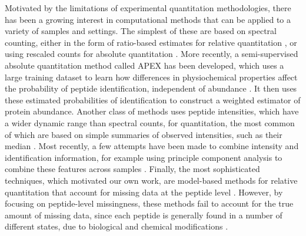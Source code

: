 Motivated by the limitations of experimental quantitation methodologies, there has been a growing interest in computational methods that can be applied to a variety of samples and settings.
The simplest of these are based on spectral counting, either in the form of ratio-based estimates for relative quantitation \citep{Liu:2004hv}, or using rescaled counts for absolute quantitation \citep{Ishihama:2005ir}.
More recently, a semi-supervised absolute quantitation method called APEX has been developed, which uses a large training dataset to learn how differences in physiochemical properties affect the probability of peptide identification, independent of abundance \citep{Lu:2006p10143}.
It then uses these estimated probabilities of identification to construct a weighted estimator of protein abundance.
%
Another class of methods uses peptide intensities, which have a wider dynamic range than spectral counts, for quantitation, the most common of which are based on simple summaries of observed intensities, such as their median \citep{deGodoy:2008jk, Silva:2005cn}.
Most recently, a few attempts have been made to combine intensity and identification information, for example using principle component analysis to combine these features across samples \citep[e.g.,][]{Dicker:2010ea}.
Finally, the most sophisticated techniques, which motivated our own work, are model-based methods for relative quantitation that account for missing data at the peptide level \citep{Karpievitch:2009wb,Luo:2009ff}.
However, by focusing on peptide-level missingness, these methods fail to account for the true amount of missing data, since each peptide is generally found in a number of different states, due to biological and chemical modifications \citep{Michalski:2011gm}.

